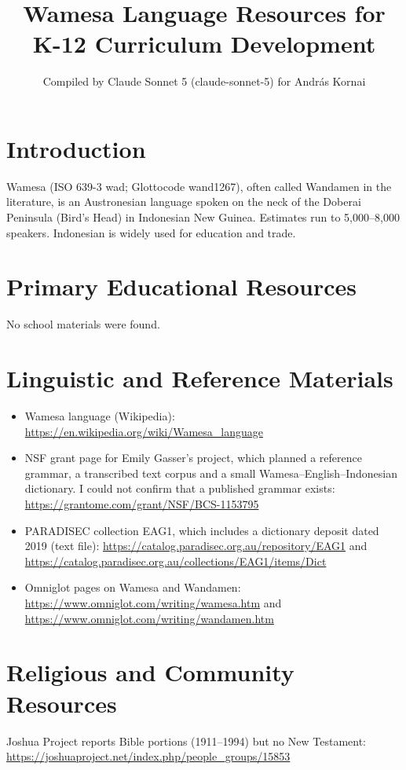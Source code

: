 \documentclass[12pt]{article}
\title{Wamesa Language Resources for K-12 Curriculum Development}
\author{Compiled by Claude Sonnet 5 (claude-sonnet-5) for Andr\'as Kornai}
\date{}
\begin{document}
\maketitle

\section{Introduction}
Wamesa (ISO 639-3 wad; Glottocode wand1267), often called Wandamen in the literature, is an Austronesian language spoken on the neck of the Doberai Peninsula (Bird's Head) in Indonesian New Guinea. Estimates run to 5,000--8,000 speakers. Indonesian is widely used for education and trade.

\section{Primary Educational Resources}
No school materials were found.

\section{Linguistic and Reference Materials}
\begin{itemize}
\item Wamesa language (Wikipedia): \url{https://en.wikipedia.org/wiki/Wamesa_language}
\item NSF grant page for Emily Gasser's project, which planned a reference grammar, a transcribed text corpus and a small Wamesa--English--Indonesian dictionary. I could not confirm that a published grammar exists: \url{https://grantome.com/grant/NSF/BCS-1153795}
\item PARADISEC collection EAG1, which includes a dictionary deposit dated 2019 (text file): \url{https://catalog.paradisec.org.au/repository/EAG1} and \url{https://catalog.paradisec.org.au/collections/EAG1/items/Dict}
\item Omniglot pages on Wamesa and Wandamen: \url{https://www.omniglot.com/writing/wamesa.htm} and \url{https://www.omniglot.com/writing/wandamen.htm}
\end{itemize}

\section{Religious and Community Resources}
Joshua Project reports Bible portions (1911--1994) but no New Testament: \url{https://joshuaproject.net/index.php/people_groups/15853}
\end{document}
